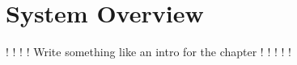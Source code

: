 \chapter{System Overview}\label{ch:hardware}

! ! ! ! Write something like an intro for the chapter ! ! ! ! !